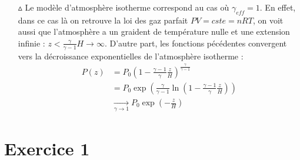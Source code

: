 \documentclass{report}
\begin{document}
\begin{itemize}
	\item[$\vartriangle$] Le modèle d'atmosphère isotherme correspond au cas où $\gamma_{eff}=1$. En effet, dans ce cas là on retrouve la loi des gaz parfait $PV=cste=nRT$, on voit aussi que l'atmosphère a un graident de température nulle et une extension infinie : $z<\frac{\gamma}{\gamma-1}H\longrightarrow\infty$. D'autre part, les fonctions pécédentes convergent vers la décroissance exponentielles de l'atmosphère isotherme :
	\begin{align*}
		P(z)&=P_0\left(1-\frac{\gamma-1}{\gamma}\frac{z}{H} \right)^{\frac{\gamma}{\gamma-1}}\\
		&=P_0\exp\left(\frac{\gamma}{\gamma-1}\ln\left(1-\frac{\gamma-1}{\gamma}\frac{z}{H} \right)\right) \\
		&\xrightarrow[\gamma\to1]{} P_0\exp\left(-\frac{z}{H} \right) 
	\end{align*}

\end{itemize}

\section*{Exercice 1}
\end{document}
